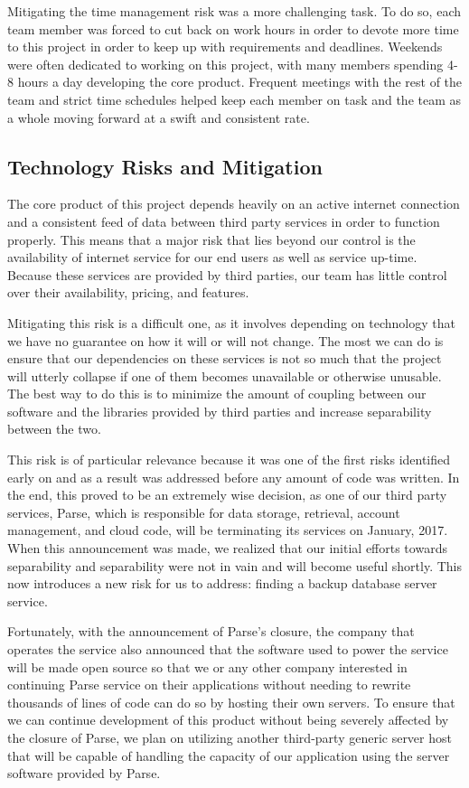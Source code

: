 Mitigating the time management risk was a more challenging task. To do so, each
team member was forced to cut back on work hours in order to devote more time to
this project in order to keep up with requirements and deadlines. Weekends were often dedicated to working on this project, with many members spending 4-8 hours
a day developing the core product. Frequent meetings with the rest of the team
and strict time schedules helped keep each member on task and the team as a
whole moving forward at a swift and consistent rate.


\subsection{Technology Risks and Mitigation}

The core product of this project depends heavily on an active internet
connection and a consistent feed of data between third party services in order
to function properly. This means that a major risk that lies beyond our control
is the availability of internet service for our end users as well as service
up-time. Because these services are provided by third parties, our team has
little control over their availability, pricing, and features.

Mitigating this risk is a difficult one, as it involves depending on technology
that we have no guarantee on how it will or will not change. The most we can do
is ensure that our dependencies on these services is not so much that the
project will utterly collapse if one of them becomes unavailable or otherwise
unusable. The best way to do this is to minimize the amount of coupling between
our software and the libraries provided by third parties and increase
separability between the two.

This risk is of particular relevance because it was one of the first risks
identified early on and as a result was addressed before any amount of code was
written. In the end, this proved to be an extremely wise decision, as one of our
third party services, Parse, which is responsible for data storage, retrieval,
account management, and cloud code, will be terminating its services on January,
2017. When this announcement was made, we realized that our initial efforts
towards separability and separability were not in vain and will become useful
shortly. This now introduces a new risk for us to address: finding a backup
database server service.

Fortunately, with the announcement of Parse's closure, the company that operates
the service also announced that the software used to power the service will be
made open source so that we or any other company interested in continuing Parse
service on their applications without needing to rewrite thousands of lines of
code can do so by hosting their own servers. To ensure that we can continue
development of this product without being severely affected by the closure of
Parse, we plan on utilizing another third-party generic server host that will
be capable of handling the capacity of our application using the server software
provided by Parse.


